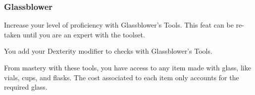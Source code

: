 %

\subsubsection{Glassblower} \label{feat::glassblower}
    Increase your level of proficiency with Glassblower's Tools.
    This feat can be re-taken until you are an expert with the toolset.

    You add your Dexterity modifier to checks with Glassblower's Tools.

    From mastery with these tools, you have access to any item made with glass, like vials, cups, and flasks.
    The cost associated to each item only accounts for the required glass.

